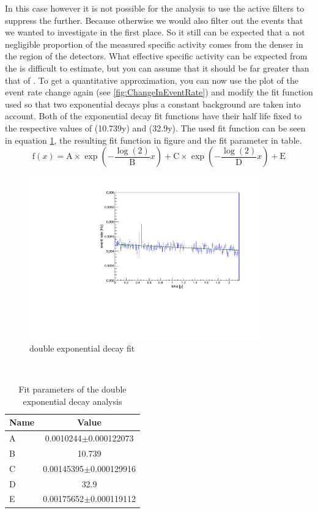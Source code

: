 \documentclass[encoding=utf8,british]{tumphthesis}
\begin{document}
In this case however it is not possible for the analysis to use the active filters to suppress the  further.
Because otherwise we would also filter out the \Kr events that we wanted to investigate in the first place.
So it still can be expected that a not negligible proportion of the measured specific activity comes from the denser  in the region of the detectors.
What effective specific activity can be expected from the  is difficult to estimate, but you can assume that it should be far greater than that of \Kr.
To get a quantitative approximation, you can now use the plot of the event rate change again (see \ref{fig:ChangeInEventRate}) and modify the fit function used so that two exponential decays plus a constant background are taken into account.
Both of the exponential decay fit functions have their half life fixed to the respective values of \Kr (10.739y) and  (32.9y).
The used fit function can be seen in equation \ref{fig:double}, the resulting fit function in figure and the fit parameter in table.
\begin{equation}
    \mathrm{f}(x) = \mathrm{A}\times\exp\left(-\frac{\log(2)}{\mathrm{B}} x \right) + \mathrm{C}\times\exp\left(-\frac{\log(2)}{\mathrm{D}} x \right) + \mathrm{E}
\end{equation}
\begin{figure}[t!]
	\centering
	\ifmakefigures%
	\includegraphics[width=100mm]{./Bilder/doppelt.pdf}
	\fi%
	\caption{double exponential decay fit}
	\label{fig:double}
\end{figure}%
\\
\begin{table}[]
    \centering
    \begin{tabular}{|l|c|}
        \hline
        Name  & Value \\
        \hline
        A     & 0.0010244$\pm$0.000122073 \\
        \hline
        B    & 10.739 \\
        \hline
        C   & 0.00145395$\pm$0.000129916 \\
        \hline
        D  & 32.9 \\
        \hline
        E & 0.00175652$\pm$0.000119112 \\
        \hline
    \end{tabular}
    \caption{Fit parameters of the double exponential decay analysis}
    \label{tab:doubleFitpara}
\end{table}
\\
\end{document}
